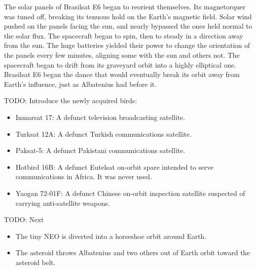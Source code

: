 The solar panels of Brasilsat E6 began to reorient themselves. Its magnetorquer was tuned off, breaking its tenuous hold on the Earth's magnetic field. Solar wind pushed on the panels facing the sun, and nearly bypassed the ones held normal to the solar flux. The spacecraft began to spin, then to steady in a direction away from the sun. The huge batteries yielded their power to change the orientation of the panels every few minutes, aligning some with the sun and others not. The spacecraft began to drift from its graveyard orbit into a highly elliptical one. Brasilsat E6 began the dance that would eventually break its orbit away from Earth's influence, just as Albatenius had before it.

TODO: Introduce the newly acquired birds:

\begin{itemize}
\item Inmarsat 17: A defunct television broadcasting satellite.
\item Turksat 12A: A defunct Turkish communications satellite.
\item Paksat-5: A defunct Pakistani communications satellite.
\item Hotbird 16B: A defunct Eutelsat on-orbit spare intended to serve communications in Africa. It was never used.
\item Yaogan 72-01F: A defunct Chinese on-orbit inspection satellite suspected of carrying anti-satellite weapons.
\end{itemize}



TODO: Next

\begin{itemize}
\item{The tiny NEO is diverted into a horseshoe orbit around Earth.}
\item{The asteroid throws Albatenius and two others out of Earth orbit toward the asteroid belt.}
\end{itemize}

\newpage
\thispagestyle{empty}